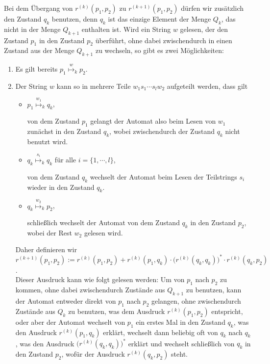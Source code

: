 \begin{enumerate}
  Bei dem \"Ubergang von $r^{(k)}(p_1, p_2)$ zu  $r^{(k+1)}(p_1, p_2)$ d\"urfen wir zus\"atzlich
  den Zustand $q_k$ benutzen, denn $q_k$ ist das einzige Element der Menge $Q_k$, das
  nicht in der Menge $Q_{k+1}$ enthalten ist.  Wird ein String $w$ gelesen, der
  den Zustand $p_1$ in den Zustand $p_2$ \"uberf\"uhrt, ohne dabei zwischendurch in einen
  Zustand aus der Menge $Q_{k+1}$ zu wechseln, so gibt es zwei M\"oglichkeiten:
  \begin{enumerate}
  \item Es gilt bereits $p_1 \stackrel{w}{\mapsto}_k p_2$.
  \item Der String $w$ kann so in mehrere Teile $w_1 s_1\cdots s_l w_2$ aufgeteilt werden,
        dass gilt
        \begin{itemize}
        \item $p_1 \stackrel{w_1}{\mapsto}_k q_k$,

               von dem Zustand $p_1$ gelangt der Automat also beim Lesen von $w_1$
               zun\"achst in den Zustand $q_k$, wobei zwischendurch der Zustand
               $q_k$ nicht benutzt wird.
        \item $q_k \stackrel{s_i}{\mapsto}_k q_k$ \quad f\"ur alle $i = \{ 1, \cdots, l\}$,

              von dem Zustand $q_k$ wechselt der Automat beim Lesen der Teilstrings
              $s_i$ wieder in den Zustand $q_k$.
        \item $q_k \stackrel{w_2}{\mapsto}_k p_2$,

              schlie{\ss}lich wechselt der Automat von dem Zustand $q_k$ in den Zustand
              $p_2$, wobei der Rest $w_2$ gelesen wird.
        \end{itemize}
        Daher definieren wir
        \\[0.2cm]
        \hspace*{1.3cm}
        $r^{(k+1)}(p_1,p_2) := 
         r^{(k)}(p_1,p_2) + 
         r^{(k)}(p_1,q_k) \cdot \bigl(r^{(k)}(q_k,q_k)\bigr)^* \cdot r^{(k)}(q_k,p_2)$.
        \\[0.2cm]
        Dieser Ausdruck kann wie folgt gelesen werden:  Um von $p_1$ nach $p_2$ zu kommen,
        ohne dabei zwischendurch Zust\"ande aus $Q_{k+1}$ zu benutzen, kann der Automat entweder direkt
        von $p_1$ nach $p_2$ gelangen, ohne zwischendurch Zust\"ande aus  $Q_k$ zu benutzen, was dem Ausdruck 
        $r^{(k)}(p_1,p_2)$ entspricht, oder aber der Automat wechselt von $p_1$ ein erstes Mal
        in den Zustand $q_k$, was den Ausdruck $r^{(k)}(p_1,q_k)$ erkl\"art, wechselt dann beliebig oft
        von $q_k$ nach $q_k$,  was den Ausdruck  $\bigl(r^{(k)}(q_k,q_k)\bigr)^*$ erkl\"art und wechselt
        schlie{\ss}lich von $q_k$ in den Zustand $p_2$, wof\"ur der Ausdruck $r^{(k)}(q_k,p_2)$ steht. 
  \end{enumerate}  
\end{enumerate}
